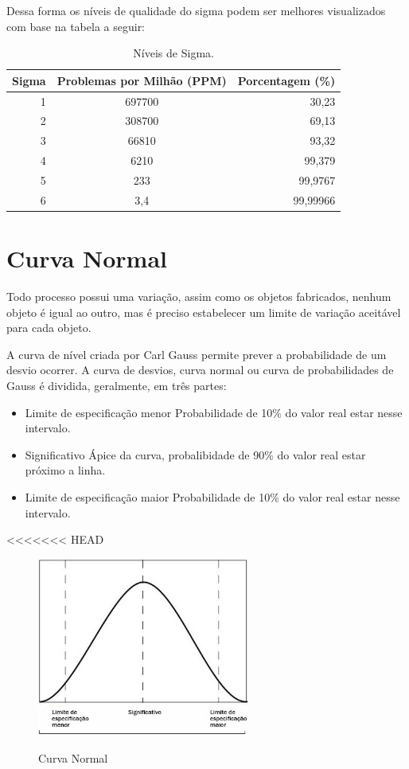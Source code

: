 \documentclass{abnt}
\begin{document}
			Dessa forma os níveis de qualidade do sigma podem ser melhores visualizados com base na tabela a seguir:
			\begin{table}[h]
				\centering

				\begin{tabular}{rcr}
					\toprule
					Sigma & Problemas por Milhão (PPM) & Porcentagem (\%) \\
					\midrule
					 1 & 697700	& 30,23 	\\
					 2 & 308700 & 69,13 	\\
					 3 & 66810 	& 93,32 	\\
					 4 & 6210 	& 99,379 	\\
					 5 & 233 	& 99,9767 	\\
					 6 & 3,4 	& 99,99966 	\\
					\bottomrule		
				\end{tabular}
	
				\label{tab_niveisSigma}
				\caption{Níveis de Sigma.}
				
			\end{table}

		\section {Curva Normal} 
			Todo processo possui uma variação, assim como os objetos fabricados, nenhum objeto é igual ao outro, mas é preciso estabelecer um limite de variação aceitável para cada objeto.
			
			A curva de nível criada por Carl Gauss permite prever a probabilidade de um desvio ocorrer. A curva de desvios, curva normal ou curva de probabilidades de Gauss é dividida, geralmente, em três partes:
			\begin{itemize}
				\item {Limite de especificação menor}
					\subitem Probabilidade de 10\% do valor real estar nesse intervalo. 
				\item {Significativo}
					\subitem Ápice da curva, probalibidade de 90\% do valor real estar próximo a linha. 
				\item {Limite de especificação maior}
					\subitem Probabilidade de 10\% do valor real estar nesse intervalo.
			\end{itemize}
<<<<<<< HEAD
			
			\begin{figure}[h]
				\centering
				\includegraphics[width=7cm, keepaspectratio]{img/curva.jpg}
				\label{fig_curva}
				\caption{Curva Normal}
			\end{figure}
		    
\end{document}
